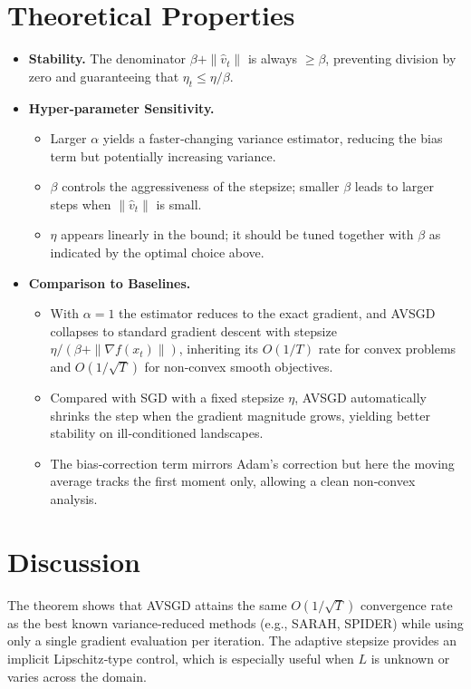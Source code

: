 \documentclass{article}
\begin{document}
\section*{Theoretical Properties}
\begin{itemize}
    \item \textbf{Stability.} The denominator $\beta+\|\hat v_t\|$ is always $\ge\beta$, preventing division by zero and guaranteeing that $\eta_t\le\eta/\beta$.
    \item \textbf{Hyper‑parameter Sensitivity.}
    \begin{itemize}
        \item Larger $\alpha$ yields a faster‑changing variance estimator, reducing the bias term but potentially increasing variance.
        \item $\beta$ controls the aggressiveness of the stepsize; smaller $\beta$ leads to larger steps when $\|\hat v_t\|$ is small.
        \item $\eta$ appears linearly in the bound; it should be tuned together with $\beta$ as indicated by the optimal choice above.
    \end{itemize}
    \item \textbf{Comparison to Baselines.}
    \begin{itemize}
        \item With $\alpha=1$ the estimator reduces to the exact gradient, and AVSGD collapses to standard gradient descent with stepsize $\eta/(\beta+\|\nabla f(x_t)\|)$, inheriting its $O(1/T)$ rate for convex problems and $O(1/\sqrt{T})$ for non‑convex smooth objectives.
        \item Compared with SGD with a fixed stepsize $\eta$, AVSGD automatically shrinks the step when the gradient magnitude grows, yielding better stability on ill‑conditioned landscapes.
        \item The bias‑correction term mirrors Adam’s correction but here the moving average tracks the first moment only, allowing a clean non‑convex analysis.
    \end{itemize}
\end{itemize}

\section*{Discussion}
The theorem shows that AVSGD attains the same $O(1/\sqrt{T})$ convergence rate as the best known variance‑reduced methods (e.g., SARAH, SPIDER) while using only a single gradient evaluation per iteration. The adaptive stepsize provides an implicit Lipschitz‑type control, which is especially useful when $L$ is unknown or varies across the domain.
\end{document}
